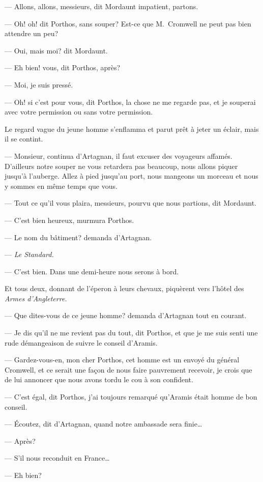 — Allons, allons, messieurs, dit Mordaunt impatient, partons.

— Oh! oh! dit Porthos, sans souper? Est-ce que M.~Cromwell ne peut pas bien attendre un peu?

— Oui, mais moi? dit Mordaunt.

— Eh bien! vous, dit Porthos, après?

— Moi, je suis pressé.

— Oh! si c'est pour vous, dit Porthos, la chose ne me regarde pas, et je souperai avec votre permission ou sans votre permission.

Le regard vague du jeune homme s'enflamma et parut prêt à jeter un éclair, mais il se contint.

— Monsieur, continua d'Artagnan, il faut excuser des voyageurs affamés. D'ailleurs notre souper ne vous retardera pas beaucoup, nous allons piquer jusqu'à l'auberge. Allez à pied jusqu'au port, nous mangeons un morceau et nous y sommes en même temps que vous.

— Tout ce qu'il vous plaira, messieurs, pourvu que nous partions, dit Mordaunt.

— C'est bien heureux, murmura Porthos.

— Le nom du bâtiment? demanda d'Artagnan.

— \textit{Le Standard.}

— C'est bien. Dans une demi-heure nous serons à bord.

Et tous deux, donnant de l'éperon à leurs chevaux, piquèrent vers l'hôtel des \textit{Armes d'Angleterre.}

— Que dites-vous de ce jeune homme? demanda d'Artagnan tout en courant.

— Je dis qu'il ne me revient pas du tout, dit Porthos, et que je me suis senti une rude démangeaison de suivre le conseil d'Aramis.

— Gardez-vous-en, mon cher Porthos, cet homme est un envoyé du général Cromwell, et ce serait une façon de nous faire pauvrement recevoir, je crois que de lui annoncer que nous avons tordu le cou à son confident.

— C'est égal, dit Porthos, j'ai toujours remarqué qu'Aramis était homme de bon conseil.

— Écoutez, dit d'Artagnan, quand notre ambassade sera finie\dots

— Après?

— S'il nous reconduit en France\dots

— Eh bien?

